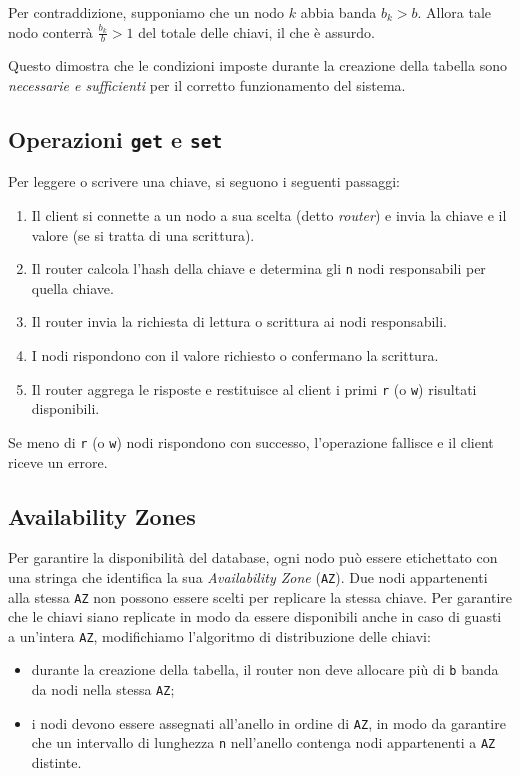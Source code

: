Per contraddizione, supponiamo che un nodo $k$ abbia banda $b_k > b$.
Allora tale nodo conterrà $\displaystyle \frac{b_k}{b} > 1$ del totale delle chiavi, il che è assurdo.

Questo dimostra che le condizioni imposte durante la creazione della tabella sono \emph{necessarie e sufficienti} per il corretto funzionamento del sistema.

\subsection{Operazioni \texttt{get} e \texttt{set}}
\label{subsec:get-set}

Per leggere o scrivere una chiave, si seguono i seguenti passaggi:
\begin{enumerate}
    \item Il client si connette a un nodo a sua scelta (detto \emph{router}) e invia la chiave e il valore (se si tratta di una scrittura).
    \item Il router calcola l'hash della chiave e determina gli \texttt{n} nodi responsabili per quella chiave.
    \item Il router invia la richiesta di lettura o scrittura ai nodi responsabili.
    \item I nodi rispondono con il valore richiesto o confermano la scrittura.
    \item Il router aggrega le risposte e restituisce al client i primi \texttt{r} (o \texttt{w}) risultati disponibili.
\end{enumerate}

Se meno di \texttt{r} (o \texttt{w}) nodi rispondono con successo, l'operazione fallisce e il client riceve un errore.

\subsection{Availability Zones}
\label{subsec:availability-zones}

Per garantire la disponibilità del database, ogni nodo può essere etichettato con una stringa che identifica la sua \emph{Availability Zone} (\texttt{AZ}).
Due nodi appartenenti alla stessa \texttt{AZ} non possono essere scelti per replicare la stessa chiave.
Per garantire che le chiavi siano replicate in modo da essere disponibili anche in caso di guasti a un'intera \texttt{AZ}, modifichiamo l'algoritmo di distribuzione delle chiavi:
\begin{itemize}
    \item durante la creazione della tabella, il router non deve allocare più di \texttt{b} banda da nodi nella stessa \texttt{AZ};
    \item i nodi devono essere assegnati all'anello in ordine di \texttt{AZ}, in modo da garantire che un intervallo di lunghezza \texttt{n} nell'anello contenga nodi appartenenti a \texttt{AZ} distinte.
\end{itemize}

